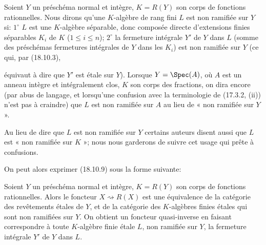 \begin{env}[18.10.10]
\label{IV.18.10.10}
Soient $Y$ un préschéma normal et intègre, $K=R(Y)$ son corps de fonctions rationnelles. Nous dirons qu'une $K$-algèbre de rang fini $L$ est non ramifiée sur $Y$ si: $1^\circ$ $L$ est une $K$-algèbre séparable, donc composée directe d'extensions finies séparables $K_i$ de $K$ ($1\leq i\leq n$); $2^\circ$ la fermeture intégrale $Y'$ de $Y$ dans $L$ (somme des préschémas fermetures intégrales de $Y$ dans les $K_i$) est non ramifiée sur $Y$ (ce qui, par (18.10.3),


équivaut à dire que $Y'$ est étale sur $Y$). Lorsque $Y=\Spec(A)$, où $A$ est un anneau intègre et intégralement clos, $K$ son corps des fractions, on dira encore (par abus de langage, et lorsqu'une confusion avec la terminologie de (17.3.2, (ii)) n'est pas à craindre) que $L$ est non ramifiée sur $A$ au lieu de « non ramifiée sur $Y$ ».
\end{env}

\begin{remark}[18.10.11]
\label{IV.18.10.11}
Au lieu de dire que $L$ est non ramifiée sur $Y$ certains auteurs disent aussi que $L$ est « non ramifiée sur $K$ »; nous nous garderons de suivre cet usage qui prête à confusions.
\end{remark}

On peut alors exprimer (18.10.9) sous la forme suivante:

\begin{corollary}[18.10.12]
\label{IV.18.10.12}
Soient $Y$ un préschéma normal et intègre, $K=R(Y)$ son corps de fonctions rationnelles. Alors le foncteur $X\rightsquigarrow R(X)$ est une équivalence de la catégorie des revêtements étales de $Y$, et de la catégorie des $K$-algèbres finies étales qui sont non ramifiées sur $Y$. On obtient un foncteur quasi-inverse en faisant correspondre à toute $K$-algèbre finie étale $L$, non ramifiée sur $Y$, la fermeture intégrale $Y'$ de $Y$ dans $L$.
\end{corollary}

